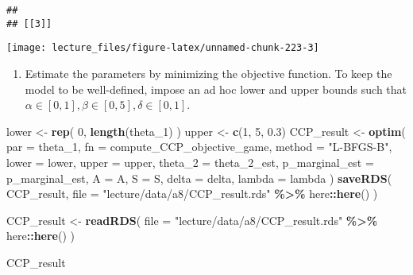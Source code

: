 \documentclass[
]{book}
\newenvironment{Shaded}{\begin{snugshade}}{\end{snugshade}}
\newcommand{\AttributeTok}[1]{\textcolor[rgb]{0.13,0.29,0.53}{#1}}
\newcommand{\DecValTok}[1]{\textcolor[rgb]{0.00,0.00,0.81}{#1}}
\newcommand{\FloatTok}[1]{\textcolor[rgb]{0.00,0.00,0.81}{#1}}
\newcommand{\FunctionTok}[1]{\textcolor[rgb]{0.13,0.29,0.53}{\textbf{#1}}}
\newcommand{\NormalTok}[1]{#1}
\newcommand{\OtherTok}[1]{\textcolor[rgb]{0.56,0.35,0.01}{#1}}
\newcommand{\SpecialCharTok}[1]{\textcolor[rgb]{0.81,0.36,0.00}{\textbf{#1}}}
\newcommand{\StringTok}[1]{\textcolor[rgb]{0.31,0.60,0.02}{#1}}
\providecommand{\tightlist}{%
  \setlength{\itemsep}{0pt}\setlength{\parskip}{0pt}}
\begin{document}
\begin{verbatim}
## 
## [[3]]
\end{verbatim}

\begin{center}\texttt{[image: lecture\_files/figure-latex/unnamed-chunk-223-3]} \end{center}

\begin{enumerate}
\def\labelenumi{\arabic{enumi}.}
\setcounter{enumi}{3}
\tightlist
\item
  Estimate the parameters by minimizing the objective function. To keep the model to be well-defined, impose an ad hoc lower and upper bounds such that \(\alpha \in [0, 1], \beta \in [0, 5], \delta \in [0, 1]\).
\end{enumerate}

\begin{Shaded}
\begin{Highlighting}[]
\NormalTok{lower }\OtherTok{\textless{}{-}} 
  \FunctionTok{rep}\NormalTok{(}
    \DecValTok{0}\NormalTok{, }
    \FunctionTok{length}\NormalTok{(theta\_1)}
\NormalTok{    )}
\NormalTok{upper }\OtherTok{\textless{}{-}} \FunctionTok{c}\NormalTok{(}\DecValTok{1}\NormalTok{, }\DecValTok{5}\NormalTok{, }\FloatTok{0.3}\NormalTok{)}
\NormalTok{CCP\_result }\OtherTok{\textless{}{-}}
  \FunctionTok{optim}\NormalTok{(}
        \AttributeTok{par =}\NormalTok{ theta\_1,}
        \AttributeTok{fn =}\NormalTok{ compute\_CCP\_objective\_game,}
        \AttributeTok{method =} \StringTok{"L{-}BFGS{-}B"}\NormalTok{,}
        \AttributeTok{lower =}\NormalTok{ lower,}
        \AttributeTok{upper =}\NormalTok{ upper,}
        \AttributeTok{theta\_2 =}\NormalTok{ theta\_2\_est,}
        \AttributeTok{p\_marginal\_est =}\NormalTok{ p\_marginal\_est,}
        \AttributeTok{A =}\NormalTok{ A,}
        \AttributeTok{S =}\NormalTok{ S,}
        \AttributeTok{delta =}\NormalTok{ delta,}
        \AttributeTok{lambda =}\NormalTok{ lambda}
\NormalTok{        )}
\FunctionTok{saveRDS}\NormalTok{(}
\NormalTok{  CCP\_result, }
  \AttributeTok{file =} \StringTok{"lecture/data/a8/CCP\_result.rds"} \SpecialCharTok{\%\textgreater{}\%}\NormalTok{ here}\SpecialCharTok{::}\FunctionTok{here}\NormalTok{()}
\NormalTok{)}
\end{Highlighting}
\end{Shaded}

\begin{Shaded}
\begin{Highlighting}[]
\NormalTok{CCP\_result }\OtherTok{\textless{}{-}} 
  \FunctionTok{readRDS}\NormalTok{(}
    \AttributeTok{file =} \StringTok{"lecture/data/a8/CCP\_result.rds"} \SpecialCharTok{\%\textgreater{}\%}\NormalTok{ here}\SpecialCharTok{::}\FunctionTok{here}\NormalTok{()}
\NormalTok{  )}

\NormalTok{CCP\_result}
\end{Highlighting}
\end{Shaded}
\end{document}
